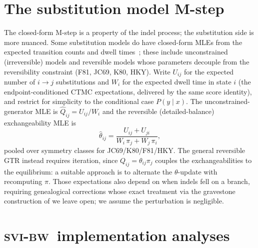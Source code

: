 \documentclass{article}
\newcommand{\svibw}{\textsc{svi-bw}}
\begin{document}
\section{The substitution model M-step}

\newcommand\expect{\mathbb{E}}
\newcommand\xpath{\mathbb{X}}
\newcommand\insrate{\lambda}
\newcommand\delrate{\mu}
\newcommand\immrate{\nu}
\newcommand{\ind}{\mathrm{ind}}
\newcommand{\imm}{\mathrm{imm}}

\label{appendix:subst-mstep}
The closed-form M-step is a property of the indel process; the substitution side is more nuanced.
Some substitution models do have closed-form MLEs
from the expected transition counts and dwell
times~\cite{HolmesRubin2002,HobolthJensen2005,HobolthJensen2011};
these include unconstrained (irreversible) models and reversible models whose parameters decouple from the
reversibility constraint (F81, JC69, K80, HKY). Write
$U_{ij}$ for the expected number of $i{\to}j$ substitutions and $W_i$ for
the expected dwell time in state $i$ (the endpoint-conditioned CTMC
expectations, delivered by the same score identity),
and restrict for simplicity to the conditional case $P(y \mid x)$.
The unconstrained-generator MLE is $\hat Q_{ij}=U_{ij}/W_i$ and the
reversible (detailed-balance) exchangeability MLE is
\begin{equation*}
\hat\theta_{ij}=\frac{U_{ij}+U_{ji}}{W_i\,\pi_j+W_j\,\pi_i},
\end{equation*}
pooled over symmetry classes for JC69/K80/F81/HKY. The general reversible
GTR instead requires iteration, since $Q_{ij}=\theta_{ij}\pi_j$ couples the
exchangeabilities to the equilibrium: a suitable approach is to alternate the
$\theta$-update with recomputing $\pi$. Those expectations also depend on
when indels fell on a branch, requiring genealogical corrections whose
exact treatment via the gravestone construction of 
we leave open; we assume the perturbation is negligible. 

\section{\svibw\ implementation analyses}
\label{appendix:svibw_appendix}
\end{document}
